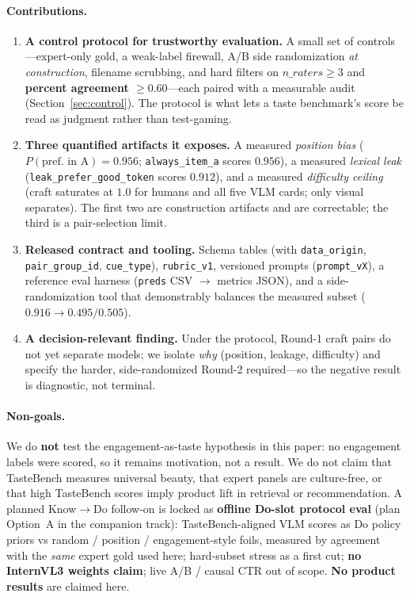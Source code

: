 \documentclass[11pt,a4paper]{article}
\begin{document}
\paragraph{Contributions.}
\begin{enumerate}[leftmargin=*,itemsep=2pt]
  \item \textbf{A control protocol for trustworthy evaluation.} A small set of controls---expert-only gold, a weak-label firewall, A/B side randomization \emph{at construction}, filename scrubbing, and hard filters on $n\_raters \ge 3$ and \textbf{percent agreement $\ge 0.60$}---each paired with a measurable audit (Section~\ref{sec:control}). The protocol is what lets a taste benchmark's score be read as judgment rather than test-gaming.
  \item \textbf{Three quantified artifacts it exposes.} A measured \emph{position bias} ($P(\text{pref.\ in A})=0.956$; \texttt{always\_item\_a} scores $0.956$), a measured \emph{lexical leak} (\texttt{leak\_prefer\_good\_token} scores $0.912$), and a measured \emph{difficulty ceiling} (craft saturates at $1.0$ for humans and all five VLM cards; only visual separates). The first two are construction artifacts and are correctable; the third is a pair-selection limit.
  \item \textbf{Released contract and tooling.} Schema tables (with \texttt{data\_origin}, \texttt{pair\_group\_id}, \texttt{cue\_type}), \texttt{rubric\_v1}, versioned prompts (\texttt{prompt\_vX}), a reference eval harness (\texttt{preds} CSV $\rightarrow$ metrics JSON), and a side-randomization tool that demonstrably balances the measured subset ($0.916 \rightarrow 0.495/0.505$).
  \item \textbf{A decision-relevant finding.} Under the protocol, Round-1 craft pairs do not yet separate models; we isolate \emph{why} (position, leakage, difficulty) and specify the harder, side-randomized Round-2 required---so the negative result is diagnostic, not terminal.
\end{enumerate}

\paragraph{Non-goals.}
We do \textbf{not} test the engagement-as-taste hypothesis in this paper: no engagement labels were scored, so it remains motivation, not a result. We do not claim that TasteBench measures universal beauty, that expert panels are culture-free, or that high TasteBench scores imply product lift in retrieval or recommendation. A planned Know$\rightarrow$Do follow-on is locked as \textbf{offline Do-slot protocol eval} (plan Option~A in the companion track): TasteBench-aligned VLM scores as Do policy priors vs random / position / engagement-style foils, measured by agreement with the \emph{same} expert gold used here; hard-subset stress as a first cut; \textbf{no InternVL3 weights claim}; live A/B / causal CTR out of scope. \textbf{No product results} are claimed here.
\end{document}
